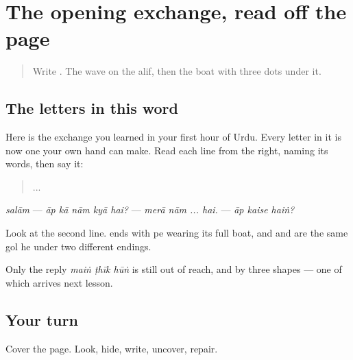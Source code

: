 \section[\texorpdfstring{\ur{آپ} \ur{کا} \ur{نام} \ur{کیا} \ur{ہے؟} (āp kā nām kyā hai?)}{آپ کا نام کیا ہے؟ (āp kā nām kyā hai?)}]{The opening exchange, read off the page}

\label{lesson:UR-C18-review-aap}



\begin{quote}
Write . The wave on the alif, then the boat with three dots under it.
\end{quote}

\subsection*{The letters in this word}
Here is the exchange you learned in your first hour of Urdu. Every letter in it is now one your own hand can make. Read each line from the right, naming its words, then say it:

\begin{quote}
\end{quote}

\begin{quote}
    
\end{quote}

\begin{quote}
  ... 
\end{quote}

\begin{quote}
  
\end{quote}

\emph{salām} — \emph{āp kā nām kyā hai?} — \emph{merā nām ... hai.} — \emph{āp kaise haiṅ?}

Look at the second line. \textbf{} ends with pe wearing its full boat, and \textbf{} and \textbf{} are the same gol he under two different endings.

Only the reply \emph{maiṅ ṭhīk hūṅ} is still out of reach, and by three shapes — one of which arrives next lesson.

\subsection*{Your turn}
Cover the page. Look, hide, write, uncover, repair.

